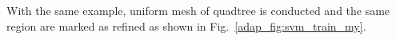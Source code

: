 %
With the same example, uniform mesh of quadtree is conducted and the same region are marked as refined as shown in Fig.~\ref{adap_fig:svm_train_my}.
\begin{figure}[!ht]
    \centering
    \begin{subfigure}[b]{1\linewidth}
        \centering
    \end{subfigure}
    \begin{subfigure}[b]{0.49\linewidth}
\end{subfigure}
\end{figure}
